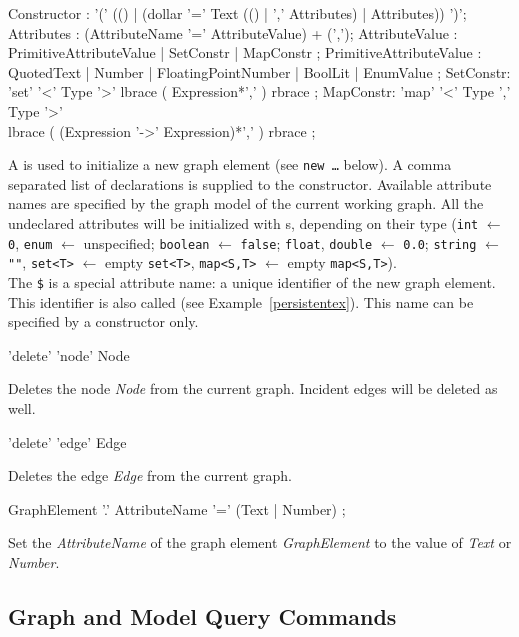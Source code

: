 \begin{rail}
  Constructor : '(' (() | (dollar '=' Text (() | ',' Attributes) | Attributes)) ')';
  Attributes : (AttributeName '=' AttributeValue) + (',');
  AttributeValue :  PrimitiveAttributeValue | SetConstr | MapConstr ;
  PrimitiveAttributeValue : QuotedText | Number | FloatingPointNumber | BoolLit | EnumValue ;
  SetConstr: 'set' '<' Type '>' lbrace ( Expression*',' ) rbrace ;
  MapConstr: 'map' '<' Type ',' Type '>' \\ lbrace ( (Expression '->' Expression)*',' ) rbrace ;
\end{rail}\indexmain{\texttt{\$}}
A  is used to initialize a new graph element (see \texttt{new \dots} below).
A comma separated list of  declarations is supplied to the constructor.
Available attribute names are specified by the graph model of the current working graph.
All the undeclared attributes will be initialized with s, depending on their type 
(\texttt{int} $\leftarrow$ \texttt{0}, \texttt{enum} $\leftarrow$ unspecified; \texttt{boolean} $\leftarrow$ \texttt{false}; \texttt{float}, \texttt{double} $\leftarrow$ \texttt{0.0}; \texttt{string} $\leftarrow$ \texttt{""}, \texttt{set<T>} $\leftarrow$ empty \texttt{set<T>}, \texttt{map<S,T>} $\leftarrow$ empty \texttt{map<S,T>}).\\
The \texttt{\$} is a special attribute name: a unique identifier of the new graph element.
This identifier is also called  (see Example~\ref{persistentex}).
This name can be specified by a constructor only.

\begin{rail}
  'delete' 'node' Node
\end{rail}
Deletes the node \emph{Node} from the current graph.
Incident edges will be deleted as well.

\begin{rail}
  'delete' 'edge' Edge
\end{rail}
Deletes the edge \emph{Edge} from the current graph.

\begin{rail}
  GraphElement '.' AttributeName '=' (Text | Number) ;
\end{rail}
Set the  \emph{AttributeName} of the graph element \emph{GraphElement} to the value of \emph{Text} or \emph{Number}.

  
\subsection{Graph and Model Query Commands}

